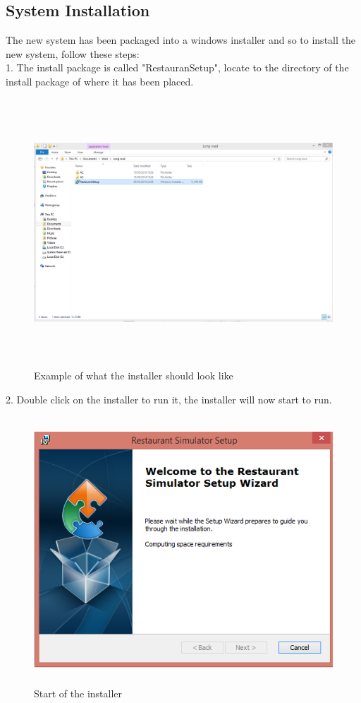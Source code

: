 \subsection{System Installation}
\begin{landscape}
The new system has been packaged into a windows installer and so to install the new system, follow these steps: \\

1. The install package is called "RestauranSetup", locate to the directory of the install package of where it has been placed. 


\begin{figure}[H]
    \includegraphics[height = 10cm]{./Manual/images/install1} 
    \caption{Example of what the installer should look like} \label{fig:install1}
\end{figure}



2. Double click on the installer to run it, the installer will now start to run.

\begin{figure}[H]
    \includegraphics[height = 10cm]{./Manual/images/install2} 
    \caption{Start of the installer} \label{fig:install2}
\end{figure}


\end{landscape}
